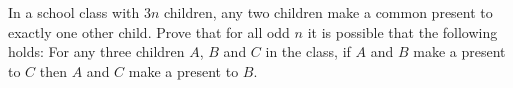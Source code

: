 In  a school class with $ 3n$ children, any two children make a common present to exactly one other child. Prove that for all odd $ n$ it is possible that the following holds: For any three children $ A$,  $ B$ and $ C$ in the class, if $ A$ and $ B$ make a present to $ C$ then $ A$ and $ C$ make a present to $ B$.